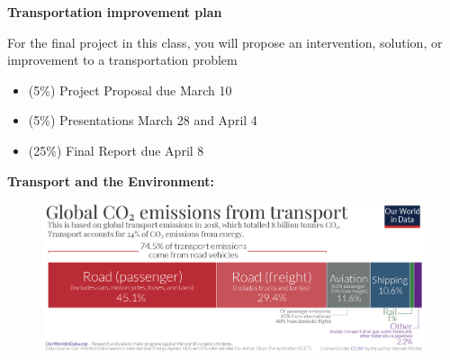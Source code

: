 \documentclass[aspectratio=169]{beamer}
\begin{document}
\begin{frame}
	
	\textbf{Transportation improvement plan}
	
	\vspace{2mm}
	
	For the final project in this class, you will propose an intervention, solution, or improvement to a transportation problem
	
	\vspace{2mm}
	
	\begin{itemize}
		\item (5\%) Project Proposal due March 10
		\item (5\%) Presentations March 28 and April 4
		\item (25\%) Final Report due April 8
	\end{itemize}
	
\end{frame}





\begin{frame}
	
	\textbf{Transport and the Environment:}

		\begin{figure}
			\centering
			\includegraphics[width=0.98\linewidth]{images/Transport-CO2-emissions-by-mode-bar-chart.png}
		\end{figure}
	
\end{frame}
\end{document}
